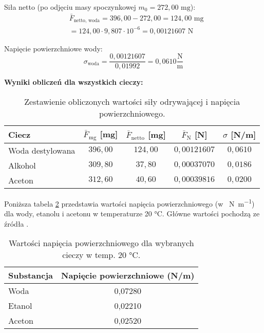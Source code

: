 \documentclass[a4paper,12pt]{article}
\begin{document}
Siła netto (po odjęciu masy spoczynkowej $m_0 = 272{,}00 \text{ mg}$):
\begin{align*}
     & \bar{F}_{\text{netto, woda}} = 396{,}00 - 272{,}00 = 124{,}00 \text{ mg} \\
     & = 124{,}00 \cdot 9{,}807 \cdot 10^{-6} = 0{,}00121607 \text{ N}
\end{align*}

Napięcie powierzchniowe wody:
$$
    \sigma_{\text{woda}} = \frac{0{,}00121607}{0{,}01992} = 0{,}0610 \frac{\text{N}}{\text{m}}
$$

\noindent\textbf{Wyniki obliczeń dla wszystkich cieczy:}

\begin{table}[H]
    \centering
    \begin{tabular}{|l|c|c|c|c|}
        \hline
        \textbf{Ciecz} & \textbf{$\bar{F}_{\text{mg}}$ [mg]} & \textbf{$\bar{F}_{\text{netto}}$ [mg]} & \textbf{$\bar{F}_{\text{N}}$ [N]} & \textbf{$\sigma$ [N/m]} \\

        \hline
        Woda destylowana & $396{,}00$ & $124{,}00$ & $0{,}00121607$ & $0{,}0610$ \\
        \hline
        Alkohol & $309{,}80$ & $37{,}80$ & $0{,}00037070$ & $0{,}0186$ \\
        \hline
        Aceton & $312{,}60$ & $40{,}60$ & $0{,}00039816$ & $0{,}0200$ \\
        \hline
    \end{tabular}
    \caption{Zestawienie obliczonych wartości siły odrywającej i napięcia powierzchniowego.}
    \label{tab:wyniki_obliczen_odrywanie}
\end{table}


Poniższa tabela \ref{tab:napiecia_powierzchniowe}
przedstawia wartości napięcia powierzchniowego (w \SI{}{\newton\per\metre}) dla wody, etanolu i acetonu w temperaturze 20 °C.
Główne wartości pochodzą ze źródła \cite{SurfaceTensionDE2024}.

\begin{table}[H]
    \centering
    \begin{tabular}{|l|c|}
        \toprule
        Substancja & Napięcie powierzchniowe (N/m) \\ %
        \midrule
        Woda       & 0,07280 \\ %
        \hline
        Etanol     & 0,02210
        \\ %
        \hline
        Aceton     & 0,02520 \\ %
        \bottomrule
    \end{tabular}
    \caption{Wartości napięcia powierzchniowego dla wybranych cieczy w temp.
        20 °C.}
    \label{tab:napiecia_powierzchniowe}
\end{table}
\end{document}
